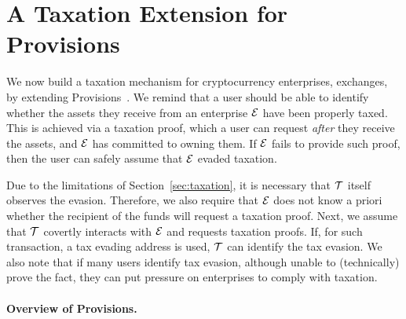 \section{A Taxation Extension for Provisions}\label{sec:provisions-extension}

We now build a taxation mechanism for cryptocurrency enterprises, \eg
exchanges, by extending Provisions~\cite{CCS:DBBCB15}. We remind that a user
should be able to identify whether the assets they receive from an enterprise
$\mathcal{E}$ have been properly taxed. This is achieved via a taxation proof,
which a user can request \emph{after} they receive the assets, and $\mathcal{E}$
has committed to owning them.  If $\mathcal{E}$ fails to provide such proof, then
the user can safely assume that $\mathcal{E}$ evaded taxation.

Due to the limitations of Section~\ref{sec:taxation}, it is necessary that
$\mathcal{T}$ itself observes the evasion. Therefore, we also require that
$\mathcal{E}$ does not know a priori whether the recipient of the funds will
request a taxation proof.  Next, we assume that $\mathcal{T}$ covertly interacts
with $\mathcal{E}$ and requests taxation proofs. If, for such transaction, a tax
evading address is used, $\mathcal{T}$ can identify the tax evasion. We also note
that if many users identify tax evasion, although unable to (technically) prove
the fact, they can put pressure on enterprises to comply with taxation.


\paragraph{Overview of Provisions.}\label{subsec:provisions-overview}

